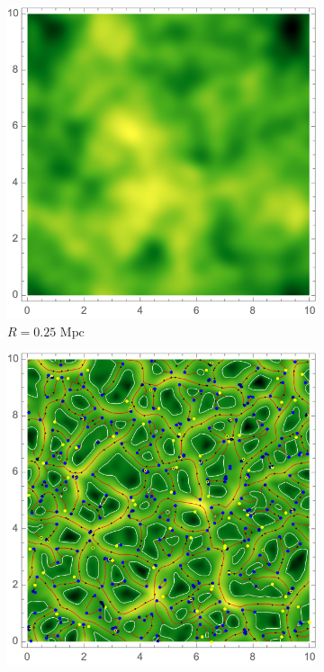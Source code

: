 \documentclass[a4paper, 11pt]{article}
\begin{document}
\begin{figure}
\vspace{-1.5cm}
\centering
\begin{subfigure}[b]{0.3\textwidth}
\includegraphics[width=\textwidth]{ScaleR=025_Psi}
\caption{$R=0.25\text{ Mpc}$}
\label{fig:}
\end{subfigure}
\begin{subfigure}[b]{0.3\textwidth}
\includegraphics[width=\textwidth]{ScaleR=025_skelet}

\end{subfigure}
\end{figure}
\end{document}
